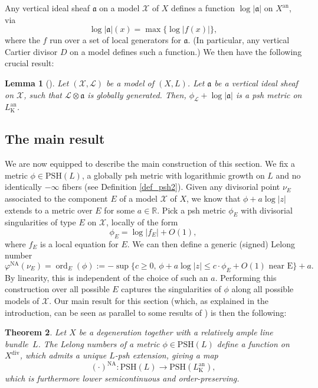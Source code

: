 \documentclass[JEP,XML,SOM,Unicode,NoEqCountersInSection,published]{cedram}
\newtheorem{theorem}{Theorem}[subsection]
\newtheorem{lemma}[theorem]{Lemma}
\theoremstyle{definition}
\newcommand\bbr{\mathbb{R}}
\newcommand\cL{\mathcal{L}}
\newcommand\cX{\mathcal{X}}
\newcommand\K{\mathrm{K}}
\newcommand\an{^{\mathrm{an}}}
\DeclareMathOperator{\ord}{ord}
\newcommand\PSH{\mathrm{PSH}}
\newcommand\na{^{\mathrm{NA}}}
\begin{document}
Any vertical ideal sheaf $\mathfrak{a}$ on a model $\cX$ of $X$ defines a function $\log|\mathfrak{a}|$ on $X\an$, via
\[
\log|\mathfrak{a}|(x)=\max \{\log|f(x)|\},
\]
where the $f$ run over a set of local generators for $\mathfrak{a}$. (In particular, any vertical Cartier divisor $D$ on a model defines such a function.) We then have the following crucial result:
\begin{lemma}[{\cite{bfjsemi}}]
Let $(\cX,\cL)$ be a model of $(X,L)$. Let $\mathfrak{a}$ be a vertical ideal sheaf on $\cX$, such that $\cL\otimes\mathfrak{a}$ is globally generated. Then, $\phi_\cL + \log|\mathfrak{a}|$ is a psh metric on $L_\K\an$.
\end{lemma}

\subsection{The main result}

We are now equipped to describe the main construction of this section. We fix a metric $\phi\in\PSH(L)$, \ie a globally psh metric with logarithmic growth on $L$ and no identically $-\infty$ fibers (see Definition \ref{def_psh2}). Given any divisorial point $\nu_E$ associated to the component $E$ of a model $\cX$ of $X$, we know that $\phi+a\log|z|$ extends to a metric over $E$ for some $a\in\bbr$. Pick a psh metric $\phi_{E}$ with divisorial singularities of type $E$ on $\cX$, \ie locally of the form
\[
\phi_{E}=\log |f_{E}| + O(1),
\]
where $f_{E}$ is a local equation for $E$. We can then define a generic (signed) Lelong number
\begin{equation}\label{eq_genericlelong}
\varphi\na(\nu_E)=\ord_E(\phi):=-\sup\{c\geq 0,\,\phi+a\log|z|\leq c\cdot \phi_{E}+O(1)\text{ near E}\}+a.
\end{equation}
By linearity, this is independent of the choice of such an $a$. Performing this construction over all possible $E$ captures the singularities of $\phi$ along all possible models of $\cX$. Our main result for this section (which, as explained in the introduction, can be seen as parallel to some results of \cite{bfjlocal}) is then the following:
\begin{theorem}\label{thm_namap}
Let $X$ be a degeneration together with a relatively ample line bundle~$L$. The Lelong numbers of a metric $\phi\in\PSH(L)$ define a function on $X^{\mathrm{div}}$, which admits a unique $L$-psh extension, giving a map
\[
(\cdot)\na:\PSH(L)\to \PSH(L_\K\an),
\]
which is furthermore lower semicontinuous and order-preserving.
\end{theorem}
\end{document}
